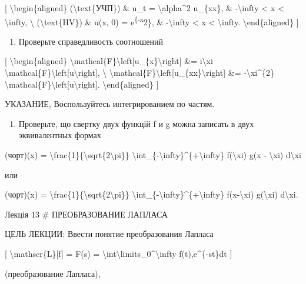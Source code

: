 \documentclass[
]{article}
\providecommand{\tightlist}{%
  \setlength{\itemsep}{0pt}\setlength{\parskip}{0pt}}
\begin{document}
{[} \textbackslash begin\{aligned\} (\textbackslash text\{УЧП\}) \& u\_t
= \textbackslash alpha\^{}2 u\_\{xx\}, \& -\textbackslash infty
\textless{} x \textless{} \textbackslash infty, \textbackslash{}
(\textbackslash text\{HV\}) \& u(x, 0) = e\textsuperscript{\{-x}2\}, \&
-\textbackslash infty \textless{} x \textless{} \textbackslash infty.
\textbackslash end\{aligned\} {]}

\begin{enumerate}
\def\labelenumi{\arabic{enumi}.}
\setcounter{enumi}{3}
\tightlist
\item
  Проверьте справедливость соотношений
\end{enumerate}

{[} \textbackslash begin\{aligned\}
\textbackslash mathcal\{F\}\textbackslash left{[}u\_\{x\}\textbackslash right{]}
\&= i\textbackslash xi
\textbackslash mathcal\{F\}\textbackslash left{[}u\textbackslash right{]},
\textbackslash{}
\textbackslash mathcal\{F\}\textbackslash left{[}u\_\{xx\}\textbackslash right{]}
\&= -\textbackslash xi\^{}\{2\}
\textbackslash mathcal\{F\}\textbackslash left{[}u\textbackslash right{]}.
\textbackslash end\{aligned\} {]}

УКАЗАНИЕ, Воспользуйтесь интегрированием по частям.

\begin{enumerate}
\def\labelenumi{\arabic{enumi}.}
\setcounter{enumi}{4}
\tightlist
\item
  Проверьте, що свертку двух функцій f и g можна записать в двух
  эквивалентных формах
\end{enumerate}

(чорт)(x) =
\textbackslash frac\{1\}\{\textbackslash sqrt\{2\textbackslash pi\}\}
\textbackslash int\_\{-\textbackslash infty\}\^{}\{+\textbackslash infty\}
f(\textbackslash xi) g(x - \textbackslash xi) d\textbackslash xi

или

(чорт)(x) =
\textbackslash frac\{1\}\{\textbackslash sqrt\{2\textbackslash pi\}\}
\textbackslash int\_\{-\textbackslash infty\}\^{}\{+\textbackslash infty\}
f(x-\textbackslash xi) g(\textbackslash xi) d\textbackslash xi.

Лекція 13 \# ПРЕОБРАЗОВАНИЕ ЛАПЛАСА

ЦЕЛЬ ЛЕКЦИИ: Ввести понятие преобразования Лапласа

{[} \textbackslash mathscr\{L\}{[}f{]} = F(s) =
\textbackslash int\textbackslash limits\_0\^{}\textbackslash infty
f(t),e\^{}\{-st\}dt {]}

(преобразование Лапласа),
\end{document}
